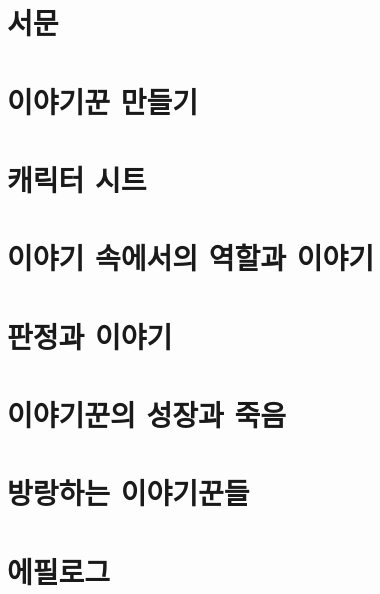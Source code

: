 \documentclass{report}
\begin{document}
	\ifprintout\else
		\parttoc
	\fi
	
	\chapter{서문}
	
	
	\hypertarget{lite-character-creation}{}
	\chapter{이야기꾼 만들기}
	
	
	\hypertarget{lite-sheets}{}
	\chapter{캐릭터 시트}
	
	
	\hypertarget{lite-roles}{}
	\chapter{이야기 속에서의 역할과 이야기}
	
	
	\chapter{판정과 이야기}
	
	
	\chapter{이야기꾼의 성장과 죽음}
	
	
	\hypertarget{wandering-storytellers}{}
	\chapter{방랑하는 이야기꾼들}
	
	
	\chapter{에필로그}
	
\end{document}
